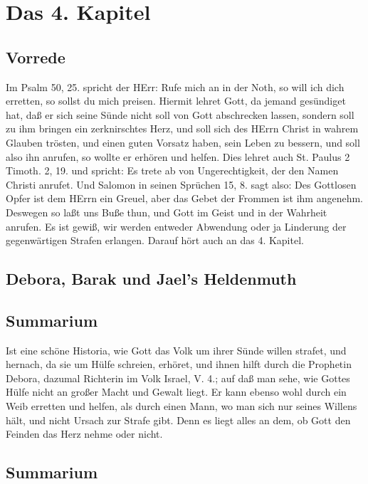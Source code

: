 \chapter{Das 4. Kapitel}

\section{Vorrede}

Im Psalm 50, 25. spricht der HErr: Rufe mich an in der Noth, so will ich dich erretten, so sollst du mich preisen. Hiermit lehret Gott, da jemand gesündiget hat, daß er sich seine Sünde nicht soll von Gott abschrecken lassen, sondern soll zu ihm bringen ein zerknirschtes Herz, und soll sich des HErrn Christ in wahrem Glauben trösten, und einen guten Vorsatz haben, sein Leben zu bessern, und soll also ihn anrufen, so wollte er erhören und helfen. Dies lehret auch St. Paulus 2 Timoth. 2, 19. und spricht: Es trete ab von Ungerechtigkeit, der den Namen Christi anrufet. Und Salomon in seinen Sprüchen 15, 8. sagt also: Des Gottlosen Opfer ist dem HErrn ein Greuel, aber das Gebet der Frommen ist ihm angenehm. Deswegen so laßt uns Buße thun, und Gott im Geist und in der Wahrheit anrufen. Es ist gewiß, wir werden entweder Abwendung oder ja Linderung der gegenwärtigen Strafen erlangen. Darauf hört auch an das 4. Kapitel.

\section{Debora, Barak und Jael's Heldenmuth}
\section{Summarium}

Ist eine schöne Historia, wie Gott das Volk um ihrer Sünde willen strafet, und hernach, da sie um Hülfe schreien, erhöret, und ihnen hilft durch die Prophetin Debora, dazumal Richterin im Volk Israel, V. 4.; auf daß man sehe, wie Gottes Hülfe nicht an großer Macht und Gewalt liegt. Er kann ebenso wohl durch ein Weib erretten und helfen, als durch einen Mann, wo man sich nur seines Willens hält, und nicht Ursach zur Strafe gibt. Denn es liegt alles an dem, ob Gott den Feinden das Herz nehme oder nicht.

\section{Summarium}

